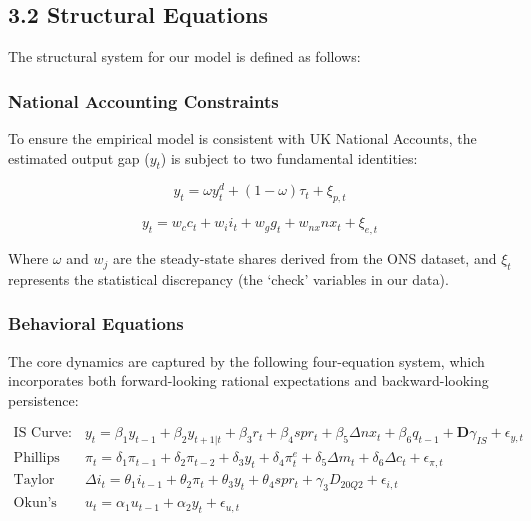 \documentclass[
  letterpaper,
  DIV=11,
  numbers=noendperiod]{scrartcl}
\begin{document}
\subsection{3.2 Structural Equations}\label{structural-equations}

The structural system for our model is defined as follows:

\subsubsection{National Accounting
Constraints}\label{national-accounting-constraints}

To ensure the empirical model is consistent with UK National Accounts,
the estimated output gap (\(y_t\)) is subject to two fundamental
identities:

\[
y_t = \omega y^d_t + (1-\omega) \tau_t + \xi_{p,t} \tag{Production Constraint}
\]

\[
y_t = w_c c_t + w_i i_t + w_g g_t + w_{nx} nx_t + \xi_{e,t} \tag{Expenditure Constraint}
\]

Where \(\omega\) and \(w_j\) are the steady-state shares derived from
the ONS dataset, and \(\xi_t\) represents the statistical discrepancy
(the `check' variables in our data).

\subsubsection{Behavioral Equations}\label{behavioral-equations}

The core dynamics are captured by the following four-equation system,
which incorporates both forward-looking rational expectations and
backward-looking persistence:

\[
\begin{aligned}
\text{IS Curve:} \quad & y_t = \beta_1 y_{t-1} + \beta_2 y_{t+1|t} + \beta_3 r_t + \beta_4 spr_t + \beta_5 \Delta nx_t + \beta_6 q_{t-1} + \mathbf{D}\gamma_{IS} + \epsilon_{y,t} \\
\text{Phillips Curve:} \quad & \pi_t = \delta_1 \pi_{t-1} + \delta_2 \pi_{t-2} + \delta_3 y_t + \delta_4 \pi^{e}_t + \delta_5 \Delta m_t + \delta_6 \Delta c_t + \epsilon_{\pi,t} \\
\text{Taylor Rule:} \quad & \Delta i_t = \theta_1 i_{t-1} + \theta_2 \pi_t + \theta_3 y_t + \theta_4 spr_t + \gamma_{3} D_{20Q2} + \epsilon_{i,t} \\
\text{Okun's Law:} \quad & u_t = \alpha_1 u_{t-1} + \alpha_2 y_t + \epsilon_{u,t}
\end{aligned}
\]
\end{document}
